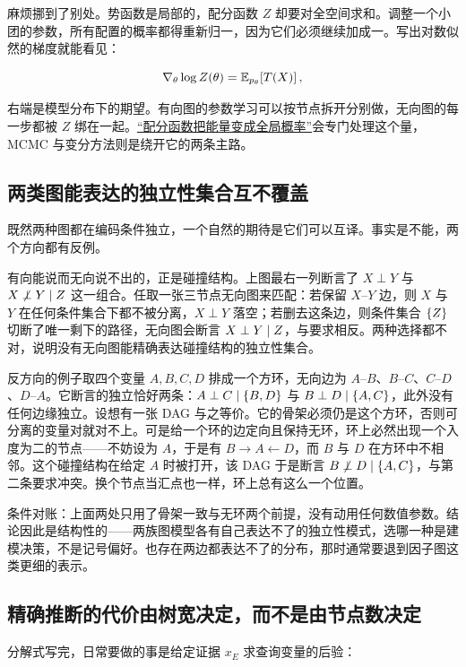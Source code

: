 麻烦挪到了别处。势函数是局部的，配分函数 \(Z\) 却要对全空间求和。调整一个小团的参数，所有配置的概率都得重新归一，因为它们必须继续加成一。写出对数似然的梯度就能看见：

\[
\nabla_\theta\log Z(\theta)=\mathbb{E}_{p_\theta}\!\left[T(X)\right],
\]

右端是模型分布下的期望。有向图的参数学习可以按节点拆开分别做，无向图的每一步都被 \(Z\) 绑在一起。\hyperref[sec:13-Machine-Learning/08-Sampling-and-Inference/06]{``配分函数把能量变成全局概率''}会专门处理这个量，MCMC 与变分方法则是绕开它的两条主路。

\subsection{两类图能表达的独立性集合互不覆盖}

既然两种图都在编码条件独立，一个自然的期待是它们可以互译。事实是不能，两个方向都有反例。

有向能说而无向说不出的，正是碰撞结构。上图最右一列断言了 \(X\perp Y\) 与 \(X\not\perp Y\mid Z\) 这一组合。任取一张三节点无向图来匹配：若保留 \(X\)--\(Y\) 边，则 \(X\) 与 \(Y\) 在任何条件集合下都不被分离，\(X\perp Y\) 落空；若删去这条边，则条件集合 \(\left\{Z\right\}\) 切断了唯一剩下的路径，无向图会断言 \(X\perp Y\mid Z\)，与要求相反。两种选择都不对，说明没有无向图能精确表达碰撞结构的独立性集合。

反方向的例子取四个变量 \(A,B,C,D\) 排成一个方环，无向边为 \(A\)--\(B\)、\(B\)--\(C\)、\(C\)--\(D\)、\(D\)--\(A\)。它断言的独立恰好两条：\(A\perp C\mid\left\{B,D\right\}\) 与 \(B\perp D\mid\left\{A,C\right\}\)，此外没有任何边缘独立。设想有一张 DAG 与之等价。它的骨架必须仍是这个方环，否则可分离的变量对就对不上。可是给一个环的边定向且保持无环，环上必然出现一个入度为二的节点——不妨设为 \(A\)，于是有 \(B\to A\leftarrow D\)，而 \(B\) 与 \(D\) 在方环中不相邻。这个碰撞结构在给定 \(A\) 时被打开，该 DAG 于是断言 \(B\not\perp D\mid\left\{A,C\right\}\)，与第二条要求冲突。换个节点当汇点也一样，环上总有这么一个位置。

条件对账：上面两处只用了骨架一致与无环两个前提，没有动用任何数值参数。结论因此是结构性的——两族图模型各有自己表达不了的独立性模式，选哪一种是建模决策，不是记号偏好。也存在两边都表达不了的分布，那时通常要退到因子图这类更细的表示。

\subsection{精确推断的代价由树宽决定，而不是由节点数决定}

分解式写完，日常要做的事是给定证据 \(x_E\) 求查询变量的后验：

